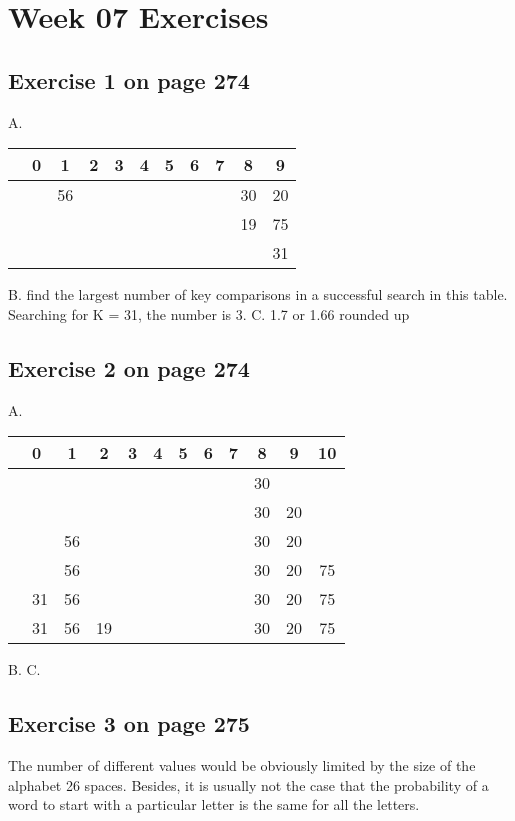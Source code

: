\documentclass[12pt]{amsart}
\begin{document}

 \section{Week 07 Exercises}
\subsection{ Exercise 1 on page 274} 
\subitem
\subitem A.\\
 \begin{tabular}{|c|l |c|c|c|c|c|c|c|c|c|}
\hline
    &0  &1 &2 &3 &4 &5 &6 &7 &8 &9 \\
    \hline
    &  &56 & & & & & & &30 &20   \\
    \hline
    &  && & & & & & &19 &75   \\
    \hline
    &  & & & & & & & & &31   \\
    \hline
   
    
\end{tabular}
\subitem B. find the largest number of key comparisons in a successful search in this table.
Searching for K = 31, the number is 3.
\subitem C. 1.7 or 1.66 rounded up

\subsection{ Exercise 2 on page 274} 
\subitem A.\\
 \begin{tabular}{|c|l |c|c|c|c|c|c|c|c|c|c|}
\hline
    &0  &1 &2 &3 &4 &5 &6 &7 &8 &9 &10 \\
    \hline
    &    &  &   &  &   &   &   & &30 & &   \\
    \hline
    &  &  &  &  &  &  &  &  &30  &20 &   \\
    \hline
    &  &56 & & & & & & &30 &20 &   \\
    \hline
   & & 56& & & & & & &30 &20 &75\\
   \hline
    &31 &56 & & & & & & &30 &20 &75\\
   \hline
    &31 &56 &19 & & & & & &30 &20 &75\\
   \hline

    
\end{tabular}
\subitem B.
\subitem C.

\subsection{Exercise 3 on page 275} 
\subitem The number of different values would be obviously limited by the size of the alphabet 26 spaces. Besides, it is usually not the case that the probability of a word to start with a particular letter is the same for all the letters. 
\end{document}
